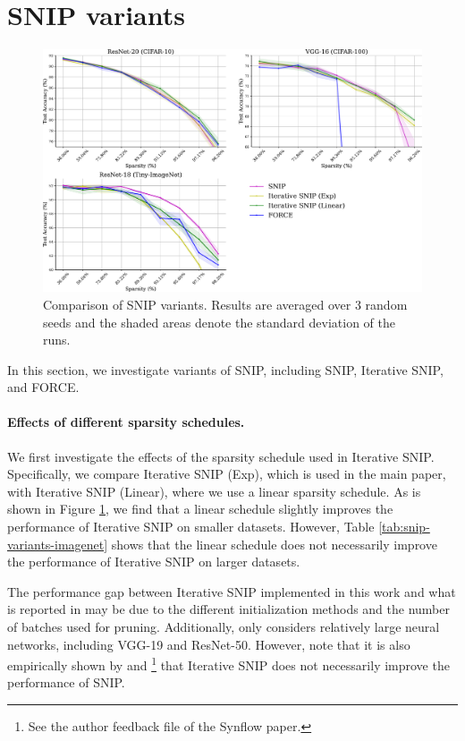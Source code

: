 \documentclass{article} %
\begin{document}
\section{SNIP variants}
\label{sect:appendix-snip_variant}
\begin{figure}[h]
  \centering
    \includegraphics[width=\textwidth]{plots/SNIP-variants-forcev2.pdf}
   \caption{Comparison of SNIP variants. Results are averaged over 3 random seeds and the shaded areas denote the standard deviation of the runs.}
   \label{fig:appendix-snip-variants}
\end{figure}


In this section, we investigate variants of SNIP, including SNIP, Iterative SNIP, and FORCE.

\paragraph{Effects of different sparsity schedules.} We first investigate the effects of the sparsity schedule used in Iterative SNIP. Specifically, we compare Iterative SNIP (Exp), which is used in the main paper, with Iterative SNIP (Linear), where we use a linear sparsity schedule. As is shown in Figure \ref{fig:appendix-snip-variants}, we find that a linear schedule slightly improves the performance of Iterative SNIP on smaller datasets. However, Table \ref{tab:snip-variants-imagenet} shows that the linear schedule does not necessarily improve the performance of Iterative SNIP on larger datasets. 

The performance gap between Iterative SNIP implemented in this work and what is reported in \citep{force} may be due to the different initialization methods and the number of batches used for pruning. Additionally, \citet{force} only considers relatively large neural networks, including VGG-19 and ResNet-50. However, note that it is also empirically shown by \citet{franklemissing} and \citet{synflow}\footnote{See the author feedback file of the Synflow paper.} that Iterative SNIP does not necessarily improve the performance of SNIP.
\end{document}
